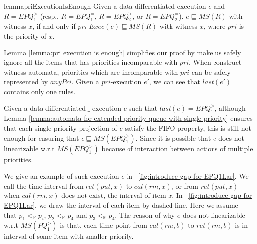 \begin{restatable}{lemma}{priExecutionIsEnough}
\label{lemma:pri execution is enough}
Given a data-differentiated execution $e$ and $R = \textit{EPQ}_1^{>}$ (resp., $R = \textit{EPQ}_1^{=}$, $R=\textit{EPQ}_2^{>}$, or $R = \textit{EPQ}_2^{=}$). $e \sqsubseteq \textit{MS}(R)$ with witness $x$, if and only if $\textit{pri-Exec}(e) \sqsubseteq \textit{MS}(R)$ with witness $x$, where $\textit{pri}$ is the priority of $x$. %
\end{restatable}

Lemma \ref{lemma:pri execution is enough} simplifies our proof by make us safely ignore all the items that has priorities incomparable with $\textit{pri}$. When construct witness automata, priorities which are incomparable with $\textit{pri}$ can be safely represented by $\textit{anyPri}$. Given a $\textit{pri}$-execution $e'$, we can see that $\textit{last}(e')$ contains only one rules.

Given a data-differentiated $\_$-execution $e$ such that $\textit{last}(e) = \textit{EPQ}_1^{>}$, although Lemma \ref{lemma:automata for extended priority queue with single priority} ensures that each single-priority projection of $e$ satisfy the FIFO property, this is still not enough for ensuring that $e \sqsubseteq \textit{MS}(\textit{EPQ}_1^{>})$. Since it is possible that $e$ does not linearizable w.r.t $\textit{MS}(\textit{EPQ}_1^{>})$ because of interaction between actions of multiple priorities.

We give an example of such execution $e$ in \figurename~\ref{fig:introduce gap for EPQ1Lar}. We call the time interval from $\textit{ret}(\textit{put},x)$ to $\textit{cal}(rm,x)$, or from $\textit{ret}(\textit{put},x)$ when $\textit{cal}(rm,x)$ does not exist, the interval of item $x$. In \figurename~\ref{fig:introduce gap for EPQ1Lar}, we draw the interval of each item by dashed line. Here we assume that $p_1 <_{\mathbb{P}} p_4$, $p_2 <_{\mathbb{P}} p_4$ and $p_3 <_{\mathbb{P}} p_4$. The reason of why $e$ does not linearizable w.r.t $\textit{MS}(\textit{PQ}_1^{>})$ is that, each time point from $\textit{cal}(\textit{rm},b)$ to $\textit{ret}(\textit{rm},b)$ is in interval of some item with smaller priority.

